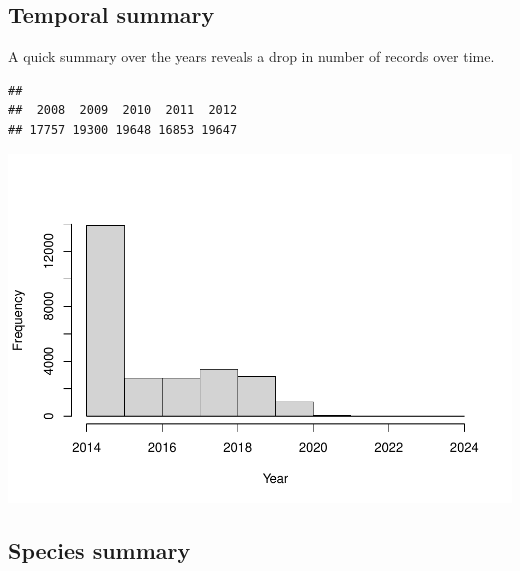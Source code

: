 \documentclass[
  10pt,
]{article}
\newenvironment{Shaded}{\begin{snugshade}}{\end{snugshade}}
\newcommand{\AttributeTok}[1]{\textcolor[rgb]{0.77,0.63,0.00}{#1}}
\newcommand{\FunctionTok}[1]{\textcolor[rgb]{0.00,0.00,0.00}{#1}}
\newcommand{\NormalTok}[1]{#1}
\newcommand{\SpecialCharTok}[1]{\textcolor[rgb]{0.00,0.00,0.00}{#1}}
\newcommand{\StringTok}[1]{\textcolor[rgb]{0.31,0.60,0.02}{#1}}
\begin{document}
\hypertarget{temporal-summary}{%
\subsection{Temporal summary}\label{temporal-summary}}

A quick summary over the years reveals a drop in number of records over time.

\begin{Shaded}
\end{Shaded}

\begin{verbatim}
## 
##  2008  2009  2010  2011  2012 
## 17757 19300 19648 16853 19647
\end{verbatim}

\begin{Shaded}
\end{Shaded}

\includegraphics{r-tools-tutorial_files/figure-latex/timeHist-1.pdf}

\hypertarget{species-summary}{%
\subsection{Species summary}\label{species-summary}}
\end{document}
